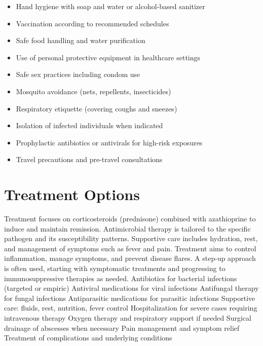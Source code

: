 \begin{itemize}[noitemsep]
  \item Hand hygiene with soap and water or alcohol-based sanitizer
  \item Vaccination according to recommended schedules
  \item Safe food handling and water purification
  \item Use of personal protective equipment in healthcare settings
  \item Safe sex practices including condom use
  \item Mosquito avoidance (nets, repellents, insecticides)
  \item Respiratory etiquette (covering coughs and sneezes)
  \item Isolation of infected individuals when indicated
  \item Prophylactic antibiotics or antivirals for high-risk exposures
  \item Travel precautions and pre-travel consultations
\end{itemize}
\section{Treatment Options}
Treatment focuses on corticosteroids (prednisone) combined with azathioprine to induce and maintain remission. Antimicrobial therapy is tailored to the specific pathogen and its susceptibility patterns. Supportive care includes hydration, rest, and management of symptoms such as fever and pain. Treatment aims to control inflammation, manage symptoms, and prevent disease flares. A step-up approach is often used, starting with symptomatic treatments and progressing to immunosuppressive therapies as needed. Antibiotics for bacterial infections (targeted or empiric) Antiviral medications for viral infections Antifungal therapy for fungal infections Antiparasitic medications for parasitic infections Supportive care: fluids, rest, nutrition, fever control Hospitalization for severe cases requiring intravenous therapy Oxygen therapy and respiratory support if needed Surgical drainage of abscesses when necessary Pain management and symptom relief Treatment of complications and underlying conditions

